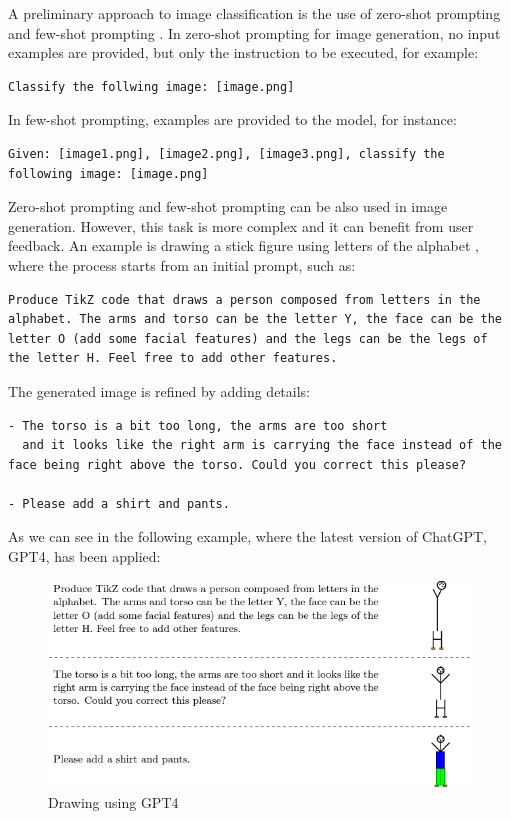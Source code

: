 A preliminary approach to image classification is the use of zero-shot prompting and few-shot prompting \cite{chen2023unleashing}.
In zero-shot prompting for image generation, no input examples are provided, but only the instruction to be executed, for example:
\begin{lstlisting}
Classify the follwing image: [image.png]
\end{lstlisting}
In few-shot prompting, examples are provided to the model, for instance:
\begin{lstlisting}
Given: [image1.png], [image2.png], [image3.png], classify the following image: [image.png]
\end{lstlisting}
Zero-shot prompting and few-shot prompting can be also used in image generation.
However, this task is more complex and it can benefit from user feedback.
An example is drawing a stick figure using letters of the alphabet \cite{proptingguide_image}, where the process starts from an initial prompt, such as:
\begin{lstlisting}
Produce TikZ code that draws a person composed from letters in the alphabet. The arms and torso can be the letter Y, the face can be the letter O (add some facial features) and the legs can be the legs of the letter H. Feel free to add other features.    
\end{lstlisting}
The generated image is refined by adding details: 
\begin{lstlisting}
- The torso is a bit too long, the arms are too short 
  and it looks like the right arm is carrying the face instead of the face being right above the torso. Could you correct this please? 

- Please add a shirt and pants.
\end{lstlisting}
As we can see in the following example, where the latest version of ChatGPT, GPT4, has been applied:
\begin{figure}[H]
    \centering
    \includegraphics[width=0.8\linewidth]{Figures/fig_10.png}
    \caption{Drawing using GPT4}
    \label{fig:10}
\end{figure}
